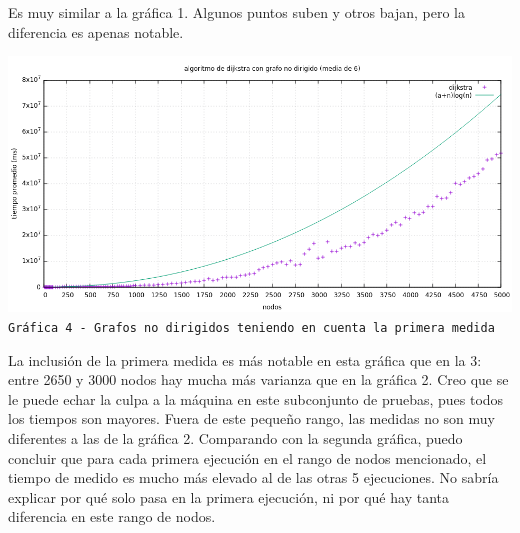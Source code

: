 \documentclass[12pt , a4paper]{article}
\begin{document}
	Es muy similar a la gráfica 1. Algunos puntos suben y otros bajan, pero la diferencia es apenas notable.
	
	
	\newpage
	\hspace*{-.15\linewidth}
	\includegraphics[width=1.25\hsize]{nodir6.png}
	\texttt{Gráfica 4 - Grafos no dirigidos teniendo en cuenta la primera medida}
	\newline
	
	La inclusión de la primera medida es más notable en esta gráfica que en la 3: entre 2650 y 3000 nodos hay mucha más varianza que en la gráfica 2. Creo que se le puede echar la culpa a la máquina en este subconjunto de pruebas, pues todos los tiempos son mayores. Fuera de este pequeño rango, las medidas no son muy diferentes a las de la gráfica 2.
	Comparando con la segunda gráfica, puedo concluir que para cada primera ejecución en el rango de nodos mencionado, el tiempo de medido es mucho más elevado al de las otras 5 ejecuciones. No sabría explicar por qué solo pasa en la primera ejecución, ni por qué hay tanta diferencia en este rango de nodos.
\end{document}
